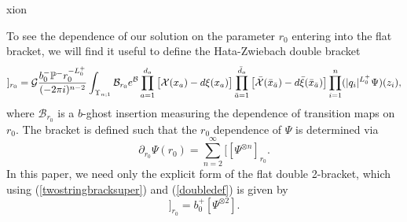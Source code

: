 xion\documentclass[12pt]{article}
\def\be{\begin{equation}}
\def\ee{\end{equation}}
\numberwithin{equation}{section}
\begin{document}
To see the dependence of our solution on the parameter $r_0$ entering into the flat bracket, we will find it useful to define the Hata-Zwiebach double bracket \cite{Hata:1993gf, Mazel:2024alu}
\be
[[\Psi^{\otimes n}]]_{r_0} =  {\cal G} {b_0^- \mathbb{P}^- r_0^{-L_0^+}\over (-2\pi i)^{n-2}} \int_{\Upsilon_{n;1}} \mathcal{B}_{r_0} e^{\cal B}\prod_{a=1}^{d_o} \big[ {\cal X}(x_a) - d\xi(x_a) \big] \prod_{\bar a=1}^{\bar d_o} \big[ \bar{\cal X}(\bar x_{\bar a}) - d\bar\xi(\bar x_{\bar a})\big] \prod_{i=1}^{n} (|q_i|^{L_0^+}\Psi)(z_i),
\label{doubledef}
\ee
where $\mathcal{B}_{r_0}$ is a $b$-ghost insertion measuring the dependence of transition maps on $r_0$.
The bracket is defined such that the $r_0$ dependence of $\Psi$ is determined via
\be
\partial_{r_0} \Psi(r_0) = \sum\limits_{n=2}^\infty [[\Psi^{\otimes n}]_{r_0}.
\ee
In this paper, we need only the explicit form of the flat double 2-bracket, which using (\ref{twostringbracksuper}) and (\ref{doubledef}) is given by
\be
[[\Psi^{\otimes 2}]]_{r_0} = b_0^+ [\Psi^{\otimes 2}].
\label{hata2}
\ee







\printbibliography
\end{document}
